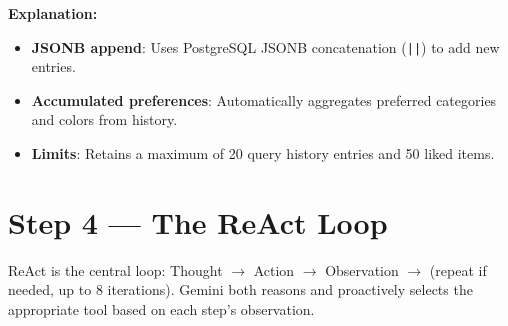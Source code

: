 \documentclass[12pt, twoside]{report}
\begin{document}
\textbf{Explanation:}
\begin{itemize}
    \item \textbf{JSONB append}: Uses PostgreSQL JSONB concatenation (\texttt{||}) to add new entries.
    \item \textbf{Accumulated preferences}: Automatically aggregates preferred categories and colors from history.
    \item \textbf{Limits}: Retains a maximum of 20 query history entries and 50 liked items.
\end{itemize}

\section{Step 4 --- The ReAct Loop}

\begin{tcolorbox}[title=Method: ReAct (Reason + Act) Loop]
ReAct is the central loop: Thought $\rightarrow$ Action $\rightarrow$ Observation $\rightarrow$ (repeat if needed, up to 8 iterations). Gemini both reasons and proactively selects the appropriate tool based on each step's observation.
\end{tcolorbox}
\end{document}
